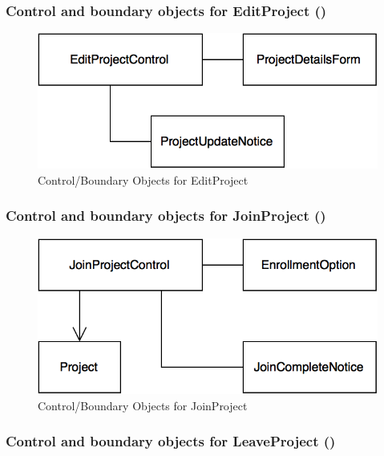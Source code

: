 \documentclass[12pt,letterpaper]{article}
\begin{document}
\subsubsection*{Control and boundary objects for EditProject (\editproject{})}

\begin{figure}[H]
	\centering{}
	\includegraphics[scale=0.4]{imgs/cbod/edit-project.png}
	\caption{Control/Boundary Objects for EditProject}    
\end{figure}

\subsubsection*{Control and boundary objects for JoinProject (\joinproject{})}

\begin{figure}[H]
	\centering{}
	\includegraphics[scale=0.4]{imgs/cbod/join-project.png}
	\caption{Control/Boundary Objects for JoinProject}    
\end{figure}

\subsubsection*{Control and boundary objects for LeaveProject (\leaveproject{})}
\end{document}

